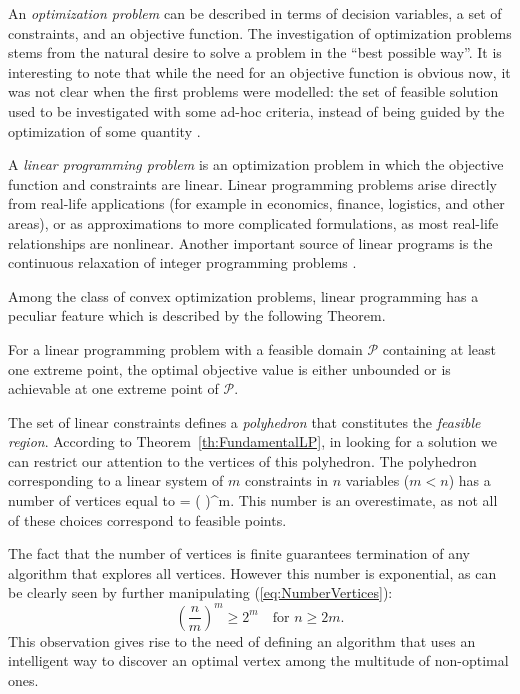 An {\em optimization problem} can be described in terms of decision variables, 
a set of constraints, and an objective function. 
The investigation of optimization problems stems from the natural
desire to solve a problem in the ``best possible way''.
It is interesting to note that while the need for an objective function 
is obvious now, it was not clear when the first problems were modelled: the 
set of feasible solution used to be investigated with some ad-hoc criteria, 
instead of being guided by the optimization of some quantity 
\cite{Dantzig02}.

A {\em linear programming problem} is an optimization problem in which
the objective function and constraints are linear. 
Linear programming problems arise directly from real-life applications
(for example in economics, finance, logistics,
and other areas), or as approximations to
more complicated formulations, as most real-life relationships are
nonlinear. Another important source of linear programs is the 
continuous relaxation of integer programming problems \cite{Schrijver86}.

Among the class of convex optimization problems, linear programming
has a peculiar feature which is described by the following Theorem.

\begin{theorem}
\label{th:FundamentalLP}
For a linear programming problem with a
feasible domain $\mathcal{P}$ containing at least one extreme point,
the optimal objective value is either
unbounded or is achievable at one extreme point of $\mathcal{P}$.
\end{theorem}

The set of linear constraints defines a {\em polyhedron} that constitutes
the {\em feasible region}.
According to Theorem~\ref{th:FundamentalLP}, in looking for a solution 
we can restrict our attention to the vertices of this polyhedron.
The polyhedron corresponding to a linear system of $m$ constraints 
in $n$ variables ($m < n$) has a number of vertices equal to
\be \label{eq:NumberVertices}
 =  \ge \left(  \right)^m.
\ee
This number is an overestimate, as not all of these choices correspond
to feasible points.

The fact that the number of vertices is finite guarantees termination 
of any algorithm that explores all vertices.
However this number is exponential, as can be clearly seen by further
manipulating (\ref{eq:NumberVertices}):
\[
\left( \frac{n}{m} \right)^m \ge 2^m 
\quad \mbox{for } n \ge 2m.
\]
This observation gives rise to the need of defining an algorithm
that uses an intelligent way to discover an optimal vertex 
among the multitude of non-optimal ones.

